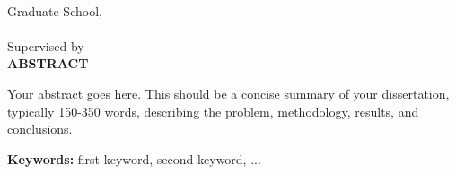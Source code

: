 \newpage
\cleardoublepage  %
\vspace*{-1.5cm}  %
\begin{center}
    {\Large\bfseries \thesistitleEn\par}    
    {\large	\department\\ Graduate School, \university}\\[1\baselineskip]
    {\large {\bfseries \thesisauthor }\\[1\baselineskip] Supervised by \supervisorEn}\\[3\baselineskip]
    {\LARGE {\bfseries ABSTRACT }}
\end{center}

Your abstract goes here. This should be a concise summary of your dissertation, typically 150-350 words, describing the problem, methodology, results, and conclusions.

\noindent\textbf{Keywords:} first keyword, second keyword, ...

\newpage 
\cleardoublepage  %
\vspace*{-50pt}   %
\tableofcontents

\newpage 
\cleardoublepage  %
\vspace*{-50pt}   %
\listoffigures
{}

\newpage 
\cleardoublepage  %
\vspace*{-50pt}   %
\listoftables
{}